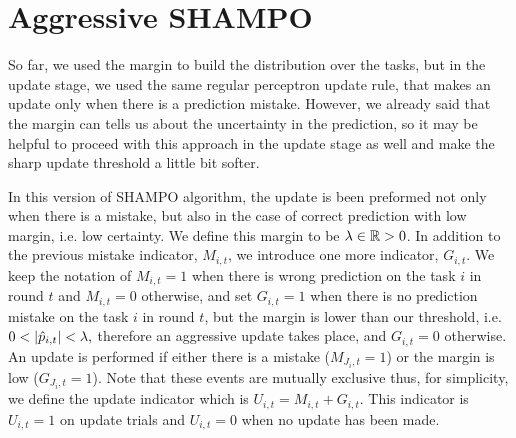 {\section{Aggressive SHAMPO}

So far, we used the margin to build the distribution over the tasks, but in the update stage,
we used the same regular perceptron update rule, that makes an update only when there is a prediction 
mistake. However, we already said that the margin can tells us about the uncertainty in the prediction, 
so it may be helpful to proceed with this approach in the update stage as well and make the sharp update 
threshold a little bit softer. 

In this  version of SHAMPO algorithm, the update is been preformed not only when there is a mistake, 
but also in the case of correct prediction with low margin, i.e. low certainty. We define this margin to be
$\lambda \in\mathbb{R}>0$. In addition to the previous mistake indicator, $M_{i,t}$,  we introduce one more 
indicator,  $G_{i,t}$. We keep the notation of  $M_{i,t}=1$ when there is wrong prediction on the task $i$
in round $t$ and $M_{i,t}=0$ otherwise, and set $G_{i,t}=1$ when there is no prediction mistake on the task 
$i$ in round $t$, but the margin is lower than our threshold, i.e. $0<\left\vert{\hat{p}_{i,t}}\right\vert<\lambda,$ therefore an
aggressive update takes place, and $G_{i,t}=0$  otherwise. 
An update is performed if either there is a mistake ($M_{J_i,t}=1$) or the margin is
low ($G_{J_i,t}=1$). Note that these events are mutually exclusive thus, for simplicity, we define the update
indicator which is  $U_{i,t}=M_{i,t}+G_{i,t}$. This indicator is  $U_{i,t}=1$ on update trials and  $U_{i,t}=0$
when no update has been made.

}
